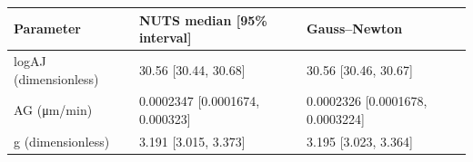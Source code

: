 \begin{tabular}{lll}
Parameter & NUTS median [95\% interval] & Gauss--Newton \\
\hline
logAJ (dimensionless) & 30.56 [30.44, 30.68] & 30.56 [30.46, 30.67] \\
AG (μm/min) & 0.0002347 [0.0001674, 0.000323] & 0.0002326 [0.0001678, 0.0003224] \\
g (dimensionless) & 3.191 [3.015, 3.373] & 3.195 [3.023, 3.364] \\
\end{tabular}
